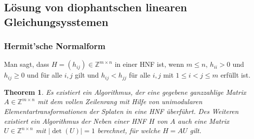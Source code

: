 \documentclass[
a4paper,landscape,16pt,
bibliography=totocnumbered,
numbers=noenddot,
]{scrartcl}
\numberwithin{equation}{subsection}
\newcommand{\Z}{\mathbb Z}
\theoremstyle{plain}
\newtheorem*{thm}{Theorem}
\theoremstyle{definition}
\begin{document}
\subsection{Lösung von diophantschen linearen Gleichungsysstemen} 


\subsubsection{Hermit'sche Normalform}

Man sagt, dass $H = (h_{ij}) \in \Z^{m \times n}$ in einer HNF ist, wenn $m \le n$, $h_{ii} > 0$ und $h_{ij} \ge 0$ und für alle $i,j$ gilt und $h_{ij} < h_{jj}$ für alle $i,j$ mit $1 \le i < j \le m$ erfüllt ist. 

\begin{thm}
	Es existiert ein Algorithmus, der eine gegebene ganzzahlige Matrix $A \in \Z^{m \times n}$ mit dem vollen Zeilenrang mit Hilfe von unimodularen Elementartransformationen der Splaten in eine HNF überführt. Des Weiteren existiert ein Algorithmus der Neben einer HNF $H$ von $A$ auch eine Matrix $U \in \Z^{n \times n}$ mit $|\det(U)|=1$ berechnet, für welche $H = A U$ gilt. 
\end{thm} 
\end{document}
